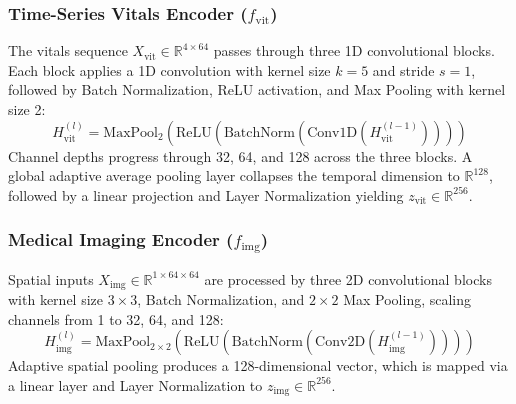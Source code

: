 \documentclass[10pt,conference]{IEEEtran}
\begin{document}
\subsubsection{Time-Series Vitals Encoder ($f_{\mathrm{vit}}$)}
The vitals sequence $X_{\mathrm{vit}} \in \mathbb{R}^{4 \times 64}$ passes through three 1D convolutional blocks. Each block applies a 1D convolution with kernel size $k=5$ and stride $s=1$, followed by Batch Normalization, ReLU activation, and Max Pooling with kernel size 2:
\begin{equation}
    H_{\mathrm{vit}}^{(l)} = \text{MaxPool}_{2}\left(\text{ReLU}\left(\text{BatchNorm}\left(\text{Conv1D}(H_{\mathrm{vit}}^{(l-1)})\right)\right)\right)
\end{equation}
Channel depths progress through 32, 64, and 128 across the three blocks. A global adaptive average pooling layer collapses the temporal dimension to $\mathbb{R}^{128}$, followed by a linear projection and Layer Normalization yielding $z_{\mathrm{vit}} \in \mathbb{R}^{256}$.

\subsubsection{Medical Imaging Encoder ($f_{\mathrm{img}}$)}
Spatial inputs $X_{\mathrm{img}} \in \mathbb{R}^{1 \times 64 \times 64}$ are processed by three 2D convolutional blocks with kernel size $3 \times 3$, Batch Normalization, and $2 \times 2$ Max Pooling, scaling channels from 1 to 32, 64, and 128:
\begin{equation}
    H_{\mathrm{img}}^{(l)} = \text{MaxPool}_{2\times 2}\left(\text{ReLU}\left(\text{BatchNorm}\left(\text{Conv2D}(H_{\mathrm{img}}^{(l-1)})\right)\right)\right)
\end{equation}
Adaptive spatial pooling produces a 128-dimensional vector, which is mapped via a linear layer and Layer Normalization to $z_{\mathrm{img}} \in \mathbb{R}^{256}$.
\end{document}

